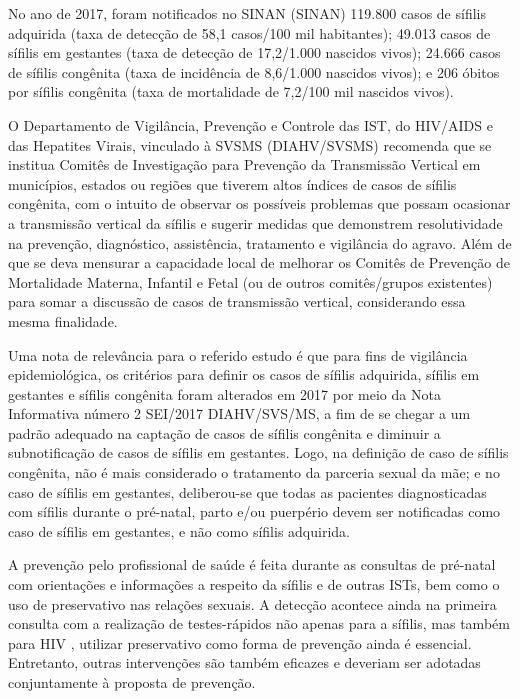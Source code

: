 No ano de 2017, foram notificados no \acrlong{SINAN} (\acrshort{SINAN}) 119.800 casos de sífilis adquirida (taxa de detecção de 58,1 casos/100 mil habitantes); 49.013 casos de sífilis em gestantes (taxa de detecção de 17,2/1.000 nascidos vivos); 24.666 casos de sífilis congênita (taxa de incidência de 8,6/1.000 nascidos vivos); e 206 óbitos por sífilis congênita (taxa de mortalidade de 7,2/100 mil nascidos vivos). \cite{boletim2018}

O Departamento de Vigilância, Prevenção e Controle das \acrshort{IST}, do HIV/AIDS e das Hepatites Virais, vinculado à \acrlong{SVSMS} (DIAHV/\acrshort{SVSMS}) recomenda que se institua Comitês de Investigação para Prevenção da Transmissão Vertical em municípios, estados ou regiões que tiverem altos índices de casos de sífilis congênita, com o intuito de observar os possíveis problemas que possam ocasionar a transmissão vertical da sífilis e sugerir medidas que demonstrem resolutividade na prevenção, diagnóstico, assistência, tratamento e vigilância do agravo. Além de que se deva mensurar a capacidade local de melhorar os Comitês de Prevenção de Mortalidade Materna, Infantil e Fetal (ou de outros comitês/grupos existentes) para somar a discussão de casos de transmissão vertical, considerando essa mesma finalidade. \cite{boletim2018}

Uma nota de relevância para o referido estudo é que para fins de vigilância epidemiológica, os critérios para definir os casos de sífilis adquirida, sífilis em gestantes e sífilis congênita foram alterados em 2017 por meio da Nota Informativa número 2 SEI/2017  DIAHV/SVS/MS, a fim de se chegar a um padrão adequado na captação de casos de sífilis congênita e diminuir a subnotificação de casos de sífilis em gestantes. Logo, na definição de caso de sífilis congênita, não é mais considerado o tratamento da parceria sexual da mãe; e no caso de sífilis em gestantes, deliberou-se que todas as pacientes diagnosticadas com sífilis durante o pré-natal, parto e/ou puerpério devem ser notificadas como caso de sífilis em gestantes, e não como sífilis adquirida. \cite{boletim2018}

A prevenção pelo profissional de saúde é feita durante as consultas de pré-natal com orientações e informações a respeito da sífilis e de outras ISTs, bem como o uso de preservativo nas relações sexuais. A detecção acontece ainda na primeira consulta com a realização de testes-rápidos não apenas para a sífilis, mas também para HIV \cite{brasilprenatal}, utilizar preservativo como forma de prevenção ainda é essencial. Entretanto, outras intervenções são também eficazes e deveriam ser adotadas conjuntamente à proposta de prevenção. \cite{brasil2015protocolo}

